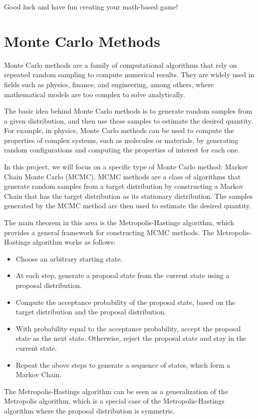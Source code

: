 \documentclass{article}
\begin{document}
\vspace{3mm}
Good luck and have fun creating your math-based game!


\pagebreak 


\section{Monte Carlo Methods}
Monte Carlo methods are a family of computational algorithms that rely on repeated random sampling to compute numerical results. They are widely used in fields such as physics, finance, and engineering, among others, where mathematical models are too complex to solve analytically.


\vspace{3mm}
The basic idea behind Monte Carlo methods is to generate random samples from a given distribution, and then use these samples to estimate the desired quantity. For example, in physics, Monte Carlo methods can be used to compute the properties of complex systems, such as molecules or materials, by generating random configurations and computing the properties of interest for each one.

\vspace{3mm}
In this project, we will focus on a specific type of Monte Carlo method: Markov Chain Monte Carlo (MCMC). MCMC methods are a class of algorithms that generate random samples from a target distribution by constructing a Markov Chain that has the target distribution as its stationary distribution. The samples generated by the MCMC method are then used to estimate the desired quantity.

\vspace{3mm}
The main theorem in this area is the Metropolis-Hastings algorithm, which provides a general framework for constructing MCMC methods. The Metropolis-Hastings algorithm works as follows:
\begin{itemize}
    \item Choose an arbitrary starting state.
    \item At each step, generate a proposal state from the current state using a proposal distribution.
    \item Compute the acceptance probability of the proposal state, based on the target distribution and the proposal distribution.
    \item With probability equal to the acceptance probability, accept the proposal state as the next state. Otherwise, reject the proposal state and stay in the current state.
    \item Repeat the above steps to generate a sequence of states, which form a Markov Chain.
\end{itemize}
The Metropolis-Hastings algorithm can be seen as a generalization of the Metropolis algorithm, which is a special case of the Metropolis-Hastings algorithm where the proposal distribution is symmetric.
\end{document}
